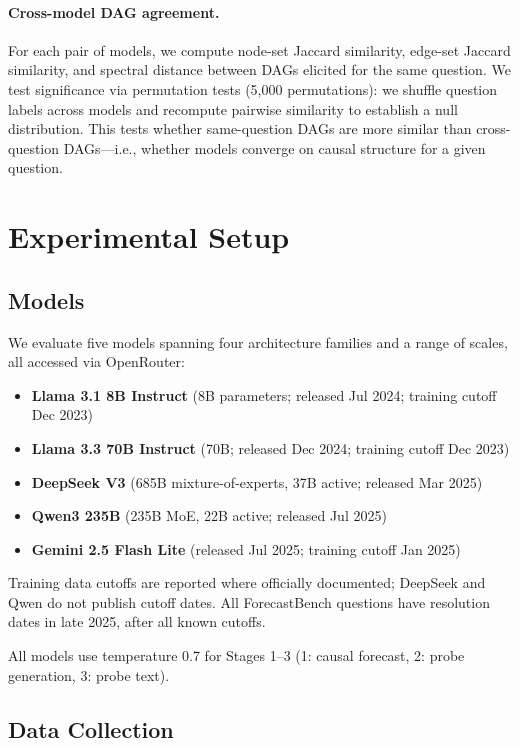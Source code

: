 \documentclass[11pt]{article}
\begin{document}
\paragraph{Cross-model DAG agreement.}
For each pair of models, we compute node-set Jaccard similarity, edge-set Jaccard similarity, and spectral distance between DAGs elicited for the same question. We test significance via permutation tests (5,000 permutations): we shuffle question labels across models and recompute pairwise similarity to establish a null distribution. This tests whether same-question DAGs are more similar than cross-question DAGs---i.e., whether models converge on causal structure for a given question.

\section{Experimental Setup}
\label{sec:setup}

\subsection{Models}

We evaluate five models spanning four architecture families and a range of scales, all accessed via OpenRouter:
\begin{itemize}
    \item \textbf{Llama 3.1 8B Instruct} (8B parameters; released Jul 2024; training cutoff Dec 2023)
    \item \textbf{Llama 3.3 70B Instruct} (70B; released Dec 2024; training cutoff Dec 2023)
    \item \textbf{DeepSeek V3} (685B mixture-of-experts, 37B active; released Mar 2025)
    \item \textbf{Qwen3 235B} (235B MoE, 22B active; released Jul 2025)
    \item \textbf{Gemini 2.5 Flash Lite} (released Jul 2025; training cutoff Jan 2025)
\end{itemize}
Training data cutoffs are reported where officially documented; DeepSeek and Qwen do not publish cutoff dates. All ForecastBench questions have resolution dates in late 2025, after all known cutoffs.

All models use temperature 0.7 for Stages 1--3 (1: causal forecast, 2: probe generation, 3: probe text).

\subsection{Data Collection}
\end{document}
